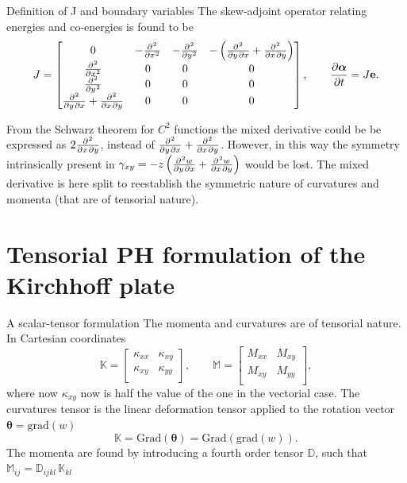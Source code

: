 \documentclass{beamer}
\begin{document}
\begin{frame}{Definition of J and boundary variables}
The skew-adjoint operator relating energies and co-energies is found to be 
\begin{equation*}
J = 
\begin{bmatrix}
0 & -\diffp[2]{}{x} & -\diffp[2]{}{y} & - \left(\diffp{}{y,x} + \diffp{}{x,y} \right)\\
\diffp[2]{}{x} & 0 & 0 & 0 \\
\diffp[2]{}{y} & 0 & 0 & 0 \\
\diffp{}{y,x} + \diffp{}{x,y} & 0 & 0 & 0 \\
\end{bmatrix}, 	\qquad
\diffp{\bm{\alpha}}{t} = J \mathbf{e}.
\end{equation*}
\begin{tcolorbox}
	From the Schwarz theorem for $C^2$ functions the mixed derivative could be be expressed as $2 \diffp{}{x,y}$, instead of $\diffp{}{y,x} + \diffp{}{x,y}$. However, in this way the symmetry intrinsically present in $\gamma_{xy} = -z \left( \diffp{w}{y,x} + \diffp{w}{x,y} \right)$ would be lost. The mixed derivative is here split to reestablish the symmetric nature of curvatures and momenta (that are of tensorial nature).
\end{tcolorbox}

\end{frame}

\section{Tensorial PH formulation of the Kirchhoff plate}

\begin{frame}{A scalar-tensor formulation}
The momenta and curvatures are of tensorial nature. In Cartesian coordinates
\begin{equation*}
\mathbb{K} = 
\begin{bmatrix}
\kappa_{xx} &  \kappa_{xy}\\
\kappa_{xy} & \kappa_{yy} \\
\end{bmatrix}, \qquad
\mathbb{M}=
\begin{bmatrix}
M_{xx} & M_{xy} \\
M_{xy} & M_{yy} \\
\end{bmatrix},
\end{equation*}
where now $\kappa_{xy}$ now is half the value of the one in the vectorial case. The curvatures tensor is the linear deformation tensor applied to the rotation vector $\bm{\theta} = \mathrm{grad}(w)$
\begin{equation*}
\mathbb{K} = \mathrm{Grad}(\bm{\theta}) =  \mathrm{Grad}(\mathrm{grad}(w)).
\end{equation*}
The momenta are found by introducing a fourth order tensor $\mathbb{D}$, such that $\mathbb{M}_{ij} = \mathbb{D}_{ijkl} \, \mathbb{K}_{kl}$
\end{frame}
\end{document}
